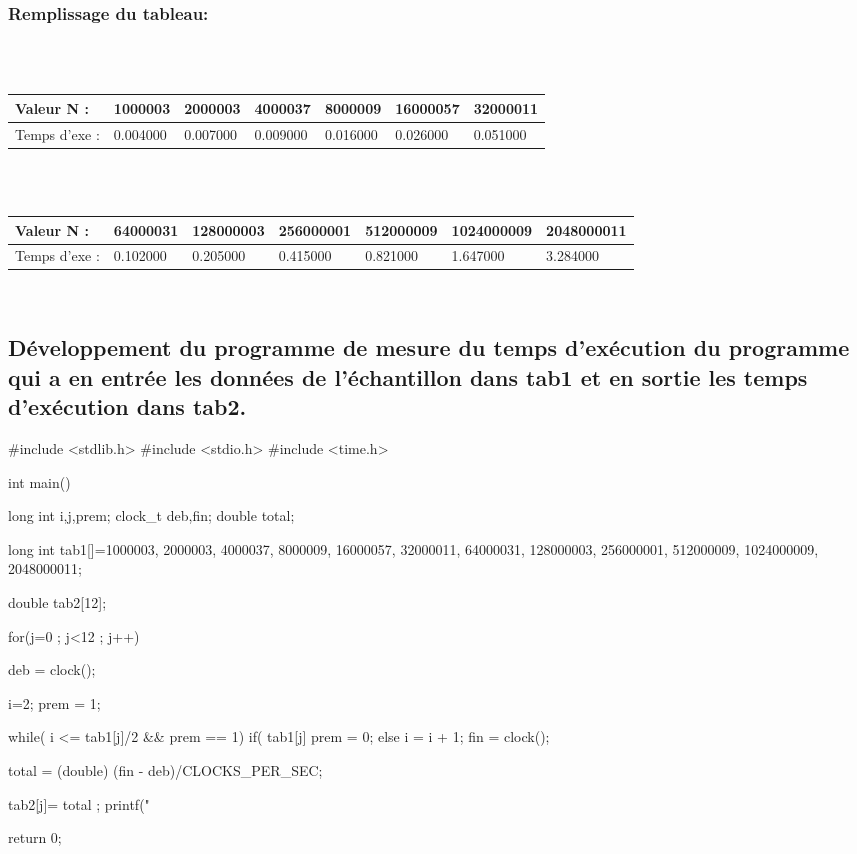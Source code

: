 \documentclass[12pt]{article}
\begin{document}
\subsubsection{Remplissage du tableau:}
\color{blue}
\textrm{  }
\\
\\
\begin{tabular}{|p{3cm}||p{1.8cm}|p{1.8cm}|p{1.8cm}|p{1.8cm}|p{1.8cm}|p{1.8cm}|}
\hline
Valeur N : & 1000003 & 2000003 & 4000037 & 8000009 & 16000057  & 32000011\\
\hline
Temps d'exe : & 0.004000 & 0.007000 & 0.009000 & 0.016000 & 0.026000 & 0.051000 \\
\hline
\end{tabular}
\\
\\
\begin{tabular}{|p{3cm}||p{1.8cm}|p{1.8cm}|p{1.8cm}|p{1.8cm}|p{1.8cm}|p{1.8cm}|}
\hline
Valeur N : & 64000031 & 128000003 & 256000001 & 512000009 &  1024000009 & 2048000011\\
\hline
Temps d'exe : &  0.102000 & 0.205000 & 0.415000 & 0.821000 &  1.647000 & 3.284000 \\
\hline
\end{tabular}


\textrm{  }
\\
\color{black}

\subsection{Développement du programme de mesure du temps d'exécution du programme qui a en entrée les données de l'échantillon dans tab1 et en sortie les temps d'exécution dans tab2. }
\begin{sql}
#include <stdlib.h>
#include <stdio.h>
#include <time.h>

int main()
{
	long int i,j,prem;
	clock_t deb,fin;
	double total;

	long int tab1[]={1000003, 2000003,	4000037,	8000009,	16000057,	32000011,	64000031,
	128000003,	256000001,	512000009,	1024000009,	2048000011};

	double tab2[12];

for(j=0 ; j<12 ; j++)
{
	deb = clock();
	
	i=2;
	prem = 1;

	while( i <= tab1[j]/2 && prem == 1){
		if( tab1[j]%
			prem = 0;
		else
			i = i + 1;
	}
	fin = clock();

	total = (double) (fin - deb)/CLOCKS_PER_SEC;
	
	tab2[j]= total ;
	printf("%
}
return 0;
}
\end{sql}
\end{document}
